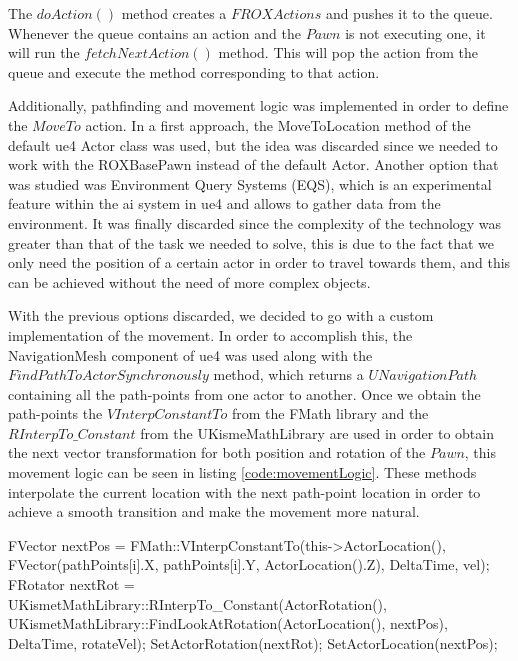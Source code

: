 The $doAction()$ method creates a $FROXActions$ and pushes it to the queue. Whenever the queue contains an action and the $Pawn$ is not executing one, it will run the $fetchNextAction()$ method. This will pop the action from the queue and execute the method corresponding to that action.

Additionally, pathfinding and movement logic was implemented in order to define the $MoveTo$ action. In a first approach, the MoveToLocation method of the default \gls{ue4} Actor class was used, but the idea was discarded since we needed to work with the ROXBasePawn instead of the default Actor. Another option that was studied was Environment Query Systems (EQS), which is an experimental feature within the \gls{ai} system in \gls{ue4} and allows to gather data from the environment. It was finally discarded since the complexity of the technology was greater than that of the task we needed to solve, this is due to the fact that we only need the position of a certain actor in order to travel towards them, and this can be achieved without the need of more complex objects. 

With the previous options discarded, we decided to go with a custom implementation of the movement. In order to accomplish this, the NavigationMesh component of \gls{ue4} was used along with the $FindPathToActorSynchronously$ method, which returns a $UNavigationPath$ containing all the path-points from one actor to another. Once we obtain the path-points the $VInterpConstantTo$ from the FMath library and the $RInterpTo\_Constant$ from the UKismeMathLibrary are used in order to obtain the next vector transformation for both position and rotation of the $Pawn$, this movement logic can be seen in listing \ref{code:movementLogic}. These methods interpolate the current location with the next path-point location in order to achieve a smooth transition and make the movement more natural.

\begin{listing}[language=C++, caption=Movement logic for the pathfinding algorithm, frame=single, label=code:movementLogic]
	FVector nextPos = FMath::VInterpConstantTo(this->ActorLocation(), FVector(pathPoints[i].X, pathPoints[i].Y, ActorLocation().Z), DeltaTime, vel);
	FRotator nextRot = UKismetMathLibrary::RInterpTo_Constant(ActorRotation(), UKismetMathLibrary::FindLookAtRotation(ActorLocation(), nextPos), DeltaTime, rotateVel);
	SetActorRotation(nextRot);
	SetActorLocation(nextPos);
\end{listing}

